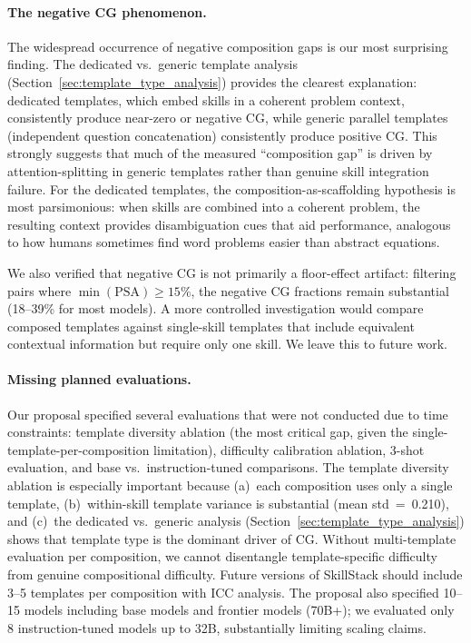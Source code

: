 \documentclass{article}
\begin{document}
\paragraph{The negative CG phenomenon.} The widespread occurrence of negative composition gaps is our most surprising finding. The dedicated vs.\ generic template analysis (Section~\ref{sec:template_type_analysis}) provides the clearest explanation: dedicated templates, which embed skills in a coherent problem context, consistently produce near-zero or negative CG, while generic parallel templates (independent question concatenation) consistently produce positive CG. This strongly suggests that much of the measured ``composition gap'' is driven by attention-splitting in generic templates rather than genuine skill integration failure. For the dedicated templates, the composition-as-scaffolding hypothesis is most parsimonious: when skills are combined into a coherent problem, the resulting context provides disambiguation cues that aid performance, analogous to how humans sometimes find word problems easier than abstract equations.

We also verified that negative CG is not primarily a floor-effect artifact: filtering pairs where $\min(\text{PSA}) \geq 15\%$, the negative CG fractions remain substantial (18--39\% for most models). A more controlled investigation would compare composed templates against single-skill templates that include equivalent contextual information but require only one skill. We leave this to future work.

\paragraph{Missing planned evaluations.} Our proposal specified several evaluations that were not conducted due to time constraints: template diversity ablation (the most critical gap, given the single-template-per-composition limitation), difficulty calibration ablation, 3-shot evaluation, and base vs.\ instruction-tuned comparisons. The template diversity ablation is especially important because (a)~each composition uses only a single template, (b)~within-skill template variance is substantial (mean std~=~0.210), and (c)~the dedicated vs.\ generic analysis (Section~\ref{sec:template_type_analysis}) shows that template type is the dominant driver of CG. Without multi-template evaluation per composition, we cannot disentangle template-specific difficulty from genuine compositional difficulty. Future versions of SkillStack should include 3--5 templates per composition with ICC analysis. The proposal also specified 10--15 models including base models and frontier models (70B+); we evaluated only 8 instruction-tuned models up to 32B, substantially limiting scaling claims.
\end{document}
